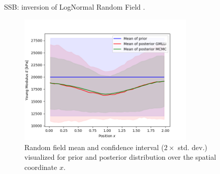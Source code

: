 	\begin{frame}{SSB: inversion of LogNormal Random Field .}
	\begin{figure}
	\includegraphics[width=0.75\textwidth]{graphs/rf_E/young_map.png}
	\caption{Random field mean and confidence interval ($2\times$ std. dev.) visualized for prior and posterior distribution over the spatial coordinate $x$.}
	\end{figure}
	\end{frame}
	
